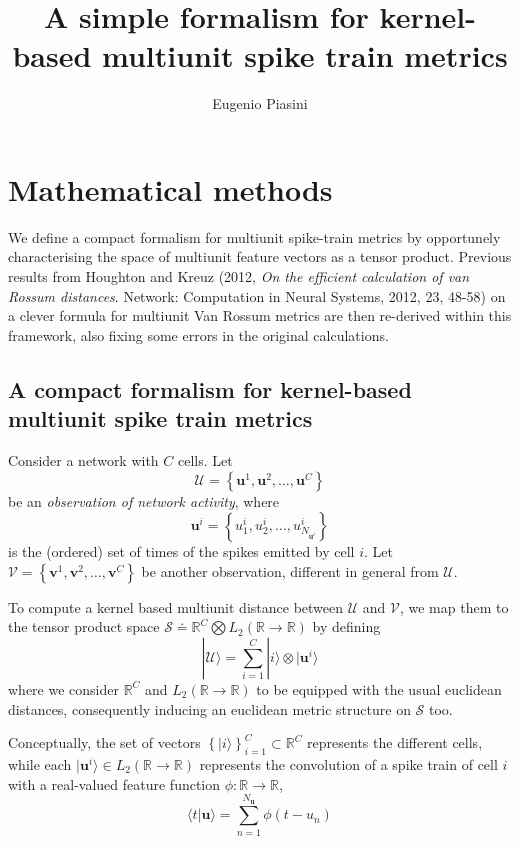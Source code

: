 \documentclass[11pt,a4paper]{article}
\title{A simple formalism for kernel-based multiunit spike train metrics}
\author{Eugenio Piasini}
\newcommand{\ket}[1]{|#1\rangle}
\newcommand{\braket}[2]{\langle #1|#2 \rangle}
\newcommand{\cU}{\mathcal{U}}
\newcommand{\cV}{\mathcal{V}}
\newcommand{\bu}{\boldsymbol{u}}
\newcommand{\bv}{\boldsymbol{v}}
\begin{document}
\maketitle
\section{Mathematical methods} %
We define a compact formalism for multiunit spike-train metrics by
opportunely characterising the space of multiunit feature vectors as a
tensor product. Previous results from Houghton and Kreuz (2012,
\emph{On the efficient calculation of van Rossum distances}. Network:
Computation in Neural Systems, 2012, 23, 48-58) on a clever formula
for multiunit Van Rossum metrics are then re-derived within this
framework, also fixing some errors in the original calculations.
\subsection{A compact formalism for kernel-based multiunit spike train
  metrics}
\noindent Consider a network with $C$ cells. Let
\begin{equation*}
\cU = \left\{ \bu^1, \bu^2, \ldots, \bu^C \right \}
\end{equation*}
be an \emph{observation of network activity}, where
\begin{equation*}
\bu^i = \left\{ u_1^i, u_2^i, \ldots, u_{N_{\bu^i}}^i \right \}
\end{equation*}
is the (ordered) set of times of the spikes emitted by cell $i$. Let
$\cV = \left\{\bv^1, \bv^2, \ldots, \bv^C\right\}$ be another
observation, different in general from $\cU$.

To compute a kernel based multiunit distance between $\cU$ and $\cV$,
we map them to the tensor product space $\mathcal{S} \doteq
\mathbb{R}^C\bigotimes L_2(\mathbb{R}\rightarrow\mathbb{R})$ by defining
\begin{equation*}
\ket{\cU} = \sum_{i=1}^C \ket{i} \otimes \ket{\bu^i}
\end{equation*}
where we consider $\mathbb{R}^C$ and $L_2(\mathbb{R}\rightarrow\mathbb{R})$ to
be equipped with the usual euclidean distances, consequently inducing
an euclidean metric structure on $\mathcal{S}$ too.

Conceptually, the set of vectors $\left\{ \ket{i} \right\}_{i=1}^C
\subset \mathbb{R}^C$ represents the different cells, while each
$\ket{\bu^i} \in L_2(\mathbb{R}\rightarrow\mathbb{R})$ represents the
convolution of a spike train of cell $i$ with a real-valued
feature function $\phi: \mathbb{R}\rightarrow\mathbb{R}$,
\begin{equation*}
\braket{t}{\bu} = \sum_{n=1}^{N_{\bu}}\phi(t-u_n)
\end{equation*}
\end{document}
